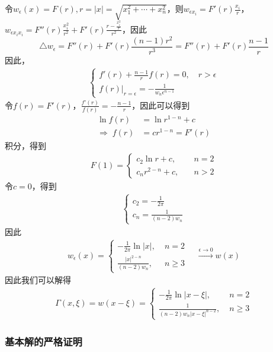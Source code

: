 \documentclass[11pt, a4paper]{article}
\theoremstyle{theorem}
\begin{document}
令$w_\epsilon(x) = F(r), r = |x| = \sqrt{x_1^2 + \cdots + x_n^2}$，则$w_{\epsilon x_i} = F'(r) \frac{x_i}{r}$，$w_{\epsilon x_i x_i} = F''(r) \frac{x_i^2}{r^2} + F'(r)\frac{r - \frac{x^2_i}{r}}{r^2}$，因此
$$
\triangle w_\epsilon = F''(r) + F'(r) \frac{(n-1)r^2}{r^3} = F''(r) + F'(r)\frac{n-1}{r}
$$
因此，
\begin{align}
    \label{Q5-1-2}
    \begin{cases}
        f'(r) + \frac{n-1}{r} f(r) = 0, \quad r > \epsilon \\
        f(r) \bigg|_{r = \epsilon} = - \frac{1}{w_n \epsilon^{n-1}}
    \end{cases}
\end{align}
令$f(r) = F'(r)$，$\frac{f'(r)}{f(r)} = -\frac{n-1}{r}$，因此可以得到
\begin{align*}
\ln f(r) &= \ln r^{1-n} + c \\
\Longrightarrow \; f(r) &= c r^{1-n} = F'(r)
\end{align*}
积分，得到
\begin{align*}
    F(1) = \begin{cases}
      c_2 \ln r + c, \quad &n = 2 \\
      c_n r^{2-n} + c, \quad &n > 2
    \end{cases}
\end{align*}
令$c = 0$，得到
\begin{align*}
    \begin{cases}
        c_2 = - \frac{1}{2\pi} \\
        c_n = \frac{1}{(n-2)w_n}
    \end{cases}
\end{align*}
因此
\begin{align}
    w_\epsilon(x) = \begin{cases}
      - \frac{1}{2 \pi} \ln |x|, \; &n = 2\\
      \frac{|x|^{2-n}}{(n-2)w_n}, \; &n \geq 3
    \end{cases}\quad \xrightarrow{\epsilon \rightarrow 0} w(x)
\end{align}
因此我们可以解得
\begin{align}
    \Gamma(x,\xi) = w(x - \xi) = \begin{cases}
    - \frac{1}{2 \pi} \ln |x - \xi|, \; &n = 2\\
    \frac{1}{(n-2)w_n|x - \xi|^{n-2}}, \; &n \geq 3
    \end{cases}
 \end{align}

 \subsubsection{基本解的严格证明}
\end{document}
